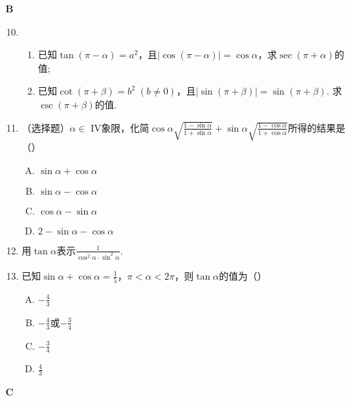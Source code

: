 \begin{center}
    \bfseries B
\end{center}
\begin{enumerate}\setcounter{enumi}{9}
    \item \begin{enumerate}[(1)]
        \item 已知$\tan(\pi-\alpha)=a^2$，且$|\cos(\pi-\alpha)|=\cos\alpha$，求$\sec(\pi+\alpha)$的值;
        \item 已知$\cot(\pi+\beta)=b^2\; (b\ne 0)$，且$|\sin(\pi+\beta)|=\sin(\pi+\beta)$. 求$\csc(\pi+\beta)$的值.
    \end{enumerate}

\item （选择题）$\alpha\in $ IV象限，化简$\cos\alpha\sqrt{\frac{1-\sin\alpha}{1+\sin\alpha}}+\sin\alpha\sqrt{\frac{1-\cos\alpha}{1+\cos\alpha}}$所得的结果是\hfill（\qquad ）
\begin{multicols}{2}
\begin{enumerate}[(A)]
    \item $\sin\alpha+\cos\alpha$
    \item $\sin\alpha-\cos\alpha$
    \item $\cos\alpha-\sin\alpha$
    \item $2-\sin\alpha-\cos\alpha$
\end{enumerate}
\end{multicols}

\item 用$\tan\alpha$表示$\frac{1}{\cos^2\alpha\cdot \sin^2\alpha}$.
\item 已知$\sin\alpha+\cos\alpha=\frac{1}{5}$，$\pi<\alpha<2\pi$，则$\tan\alpha$的值为\hfill（\qquad）
\begin{multicols}{4}
\begin{enumerate}[(A)]
    \item $-\frac{4}{3}$
    \item $-\frac{4}{3}$或$-\frac{3}{4}$
    \item $-\frac{3}{4}$
    \item $\frac{4}{3}$
\end{enumerate}
\end{multicols}
\end{enumerate}

\begin{center}
    \bfseries C
\end{center}

